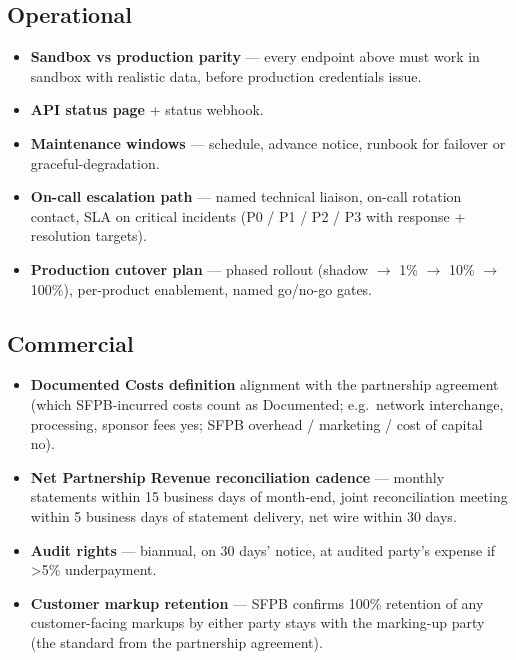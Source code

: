 \documentclass[11pt,letterpaper]{article}
\begin{document}
\subsection{Operational}
\begin{itemize}[leftmargin=1.6em]
  \item \textbf{Sandbox vs production parity} --- every endpoint above
        must work in sandbox with realistic data, before production
        credentials issue.
  \item \textbf{API status page} + status webhook.
  \item \textbf{Maintenance windows} --- schedule, advance notice,
        runbook for failover or graceful-degradation.
  \item \textbf{On-call escalation path} --- named technical liaison,
        on-call rotation contact, SLA on critical incidents
        (P0 / P1 / P2 / P3 with response + resolution targets).
  \item \textbf{Production cutover plan} --- phased rollout
        (shadow $\to$ 1\% $\to$ 10\% $\to$ 100\%), per-product
        enablement, named go/no-go gates.
\end{itemize}

\subsection{Commercial}
\begin{itemize}[leftmargin=1.6em]
  \item \textbf{Documented Costs definition} alignment with the
        partnership agreement (which SFPB-incurred costs count as
        Documented; e.g.\ network interchange, processing, sponsor
        fees yes; SFPB overhead / marketing / cost of capital no).
  \item \textbf{Net Partnership Revenue reconciliation cadence} ---
        monthly statements within 15 business days of month-end,
        joint reconciliation meeting within 5 business days of
        statement delivery, net wire within 30 days.
  \item \textbf{Audit rights} --- biannual, on 30 days' notice, at
        audited party's expense if >5\% underpayment.
  \item \textbf{Customer markup retention} --- SFPB confirms 100\%
        retention of any customer-facing markups by either party
        stays with the marking-up party (the standard from the
        partnership agreement).
\end{itemize}
\end{document}
